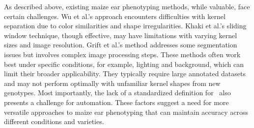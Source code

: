 

As described above, existing maize ear phenotyping methods, while valuable, face certain challenges. Wu et al.'s approach encounters difficulties with kernel separation due to color similarities and shape irregularities. Khaki et al.'s sliding window technique, though effective, may have limitations with varying kernel sizes and image resolution. Grift et al.'s method addresses some segmentation issues but involves complex image processing steps. These methods often work best under specific conditions, for example, lighting and background, which can limit their broader applicability. They typically require large annotated datasets and may not perform optimally with unfamiliar kernel shapes from new genotypes. Most importantly, the lack of a standardized definition for \KPR~also presents a challenge for automation. These factors suggest a need for more versatile approaches to maize ear phenotyping that can maintain accuracy across different conditions and varieties.